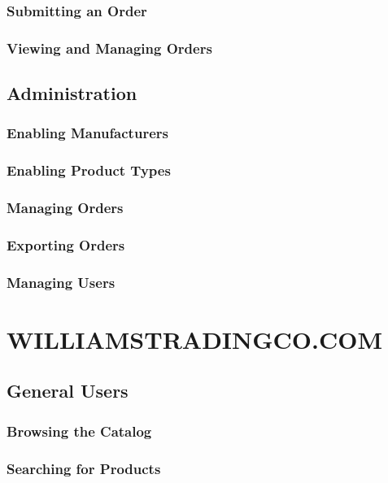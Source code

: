 \subsubsection{Submitting an Order}

\subsubsection{Viewing and Managing Orders}

\subsection{Administration}

\subsubsection{Enabling Manufacturers}

\subsubsection{Enabling Product Types}

\subsubsection{Managing Orders}

\subsubsection{Exporting Orders}

\subsubsection{Managing Users}

\section{WILLIAMSTRADINGCO.COM}

\subsection{General Users}

\subsubsection{Browsing the Catalog}

\subsubsection{Searching for Products}

